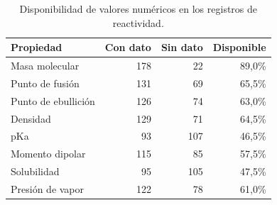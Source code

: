 \begin{table}[!t]
\centering
\begin{threeparttable}
\caption{Disponibilidad de valores numéricos en los registros de reactividad.}
\label{tab:cobertura}
\footnotesize
\begin{tabular}{lrrr}
\toprule
Propiedad & Con dato & Sin dato & Disponible \\
\midrule
Masa molecular & 178 & 22 & 89,0\% \\
Punto de fusión & 131 & 69 & 65,5\% \\
Punto de ebullición & 126 & 74 & 63,0\% \\
Densidad & 129 & 71 & 64,5\% \\
pKa & 93 & 107 & 46,5\% \\
Momento dipolar & 115 & 85 & 57,5\% \\
Solubilidad & 95 & 105 & 47,5\% \\
Presión de vapor & 122 & 78 & 61,0\% \\
\bottomrule
\end{tabular}
\begin{tablenotes}
\end{tablenotes}
\end{threeparttable}
\end{table}
